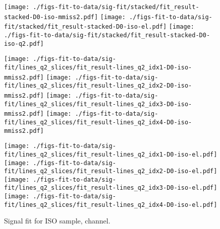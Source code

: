 \begin{figure}[htb]
    \centering
    \texttt{[image: ./figs-fit-to-data/sig-fit/stacked/fit\_result-stacked-D0-iso-mmiss2.pdf]}
    \texttt{[image: ./figs-fit-to-data/sig-fit/stacked/fit\_result-stacked-D0-iso-el.pdf]}
    \texttt{[image: ./figs-fit-to-data/sig-fit/stacked/fit\_result-stacked-D0-iso-q2.pdf]}

    \texttt{[image: ./figs-fit-to-data/sig-fit/lines\_q2\_slices/fit\_result-lines\_q2\_idx1-D0-iso-mmiss2.pdf]}
    \texttt{[image: ./figs-fit-to-data/sig-fit/lines\_q2\_slices/fit\_result-lines\_q2\_idx2-D0-iso-mmiss2.pdf]}
    \texttt{[image: ./figs-fit-to-data/sig-fit/lines\_q2\_slices/fit\_result-lines\_q2\_idx3-D0-iso-mmiss2.pdf]}
    \texttt{[image: ./figs-fit-to-data/sig-fit/lines\_q2\_slices/fit\_result-lines\_q2\_idx4-D0-iso-mmiss2.pdf]}

    \texttt{[image: ./figs-fit-to-data/sig-fit/lines\_q2\_slices/fit\_result-lines\_q2\_idx1-D0-iso-el.pdf]}
    \texttt{[image: ./figs-fit-to-data/sig-fit/lines\_q2\_slices/fit\_result-lines\_q2\_idx2-D0-iso-el.pdf]}
    \texttt{[image: ./figs-fit-to-data/sig-fit/lines\_q2\_slices/fit\_result-lines\_q2\_idx3-D0-iso-el.pdf]}
    \texttt{[image: ./figs-fit-to-data/sig-fit/lines\_q2\_slices/fit\_result-lines\_q2\_idx4-D0-iso-el.pdf]}

    \caption{Signal fit for ISO sample, \Dz channel.}
    \label{fig:sig-d0}
\end{figure}

